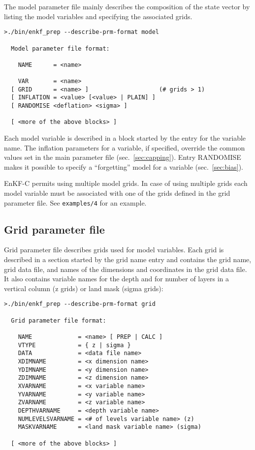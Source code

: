 \documentclass[11pt]{report}
\begin{document}
The model parameter file mainly describes the composition of the state vector by listing the model variables and specifying the associated grids.

\begin{Verbatim}[frame=single,fontsize=\footnotesize]
>./bin/enkf_prep --describe-prm-format model

  Model parameter file format:

    NAME      = <name>

    VAR       = <name>
  [ GRID      = <name> ]                    (# grids > 1)
  [ INFLATION = <value> [<value> | PLAIN] ]
  [ RANDOMISE <deflation> <sigma> ]

  [ <more of the above blocks> ]
\end{Verbatim}

Each model variable is described in a block started by the entry for the variable name.
The inflation parameters for a variable, if specified, override the common values set in the main parameter file (sec.~\ref{sec:capping}).
Entry RANDOMISE makes it possible to specify a ``forgetting'' model for a variable (sec.~\ref{sec:bias}).

EnKF-C permits using multiple model grids.
In case of using multiple grids each model variable must be associated with one of the grids defined in the grid parameter file.
See \verb|examples/4| for an example.

\subsection{Grid parameter file}
\label{sec:gridprm}

Grid parameter file describes grids used for model variables.
Each grid is described in a section started by the grid name entry and contains the grid name, grid data file, and names of the dimensions and coordinates in the grid data file.
It also contains variable names for the depth and for number of layers in a vertical column (z grids) or land mask (sigma grids):
\begin{Verbatim}[frame=single,fontsize=\footnotesize]
>./bin/enkf_prep --describe-prm-format grid

  Grid parameter file format:

    NAME             = <name> [ PREP | CALC ]
    VTYPE            = { z | sigma }
    DATA             = <data file name>
    XDIMNAME         = <x dimension name>
    YDIMNAME         = <y dimension name>
    ZDIMNAME         = <z dimension name>
    XVARNAME         = <x variable name>
    YVARNAME         = <y variable name>
    ZVARNAME         = <z variable name>
    DEPTHVARNAME     = <depth variable name>
    NUMLEVELSVARNAME = <# of levels variable name> (z)
    MASKVARNAME      = <land mask variable name> (sigma)

  [ <more of the above blocks> ]
\end{Verbatim}
\end{document}
